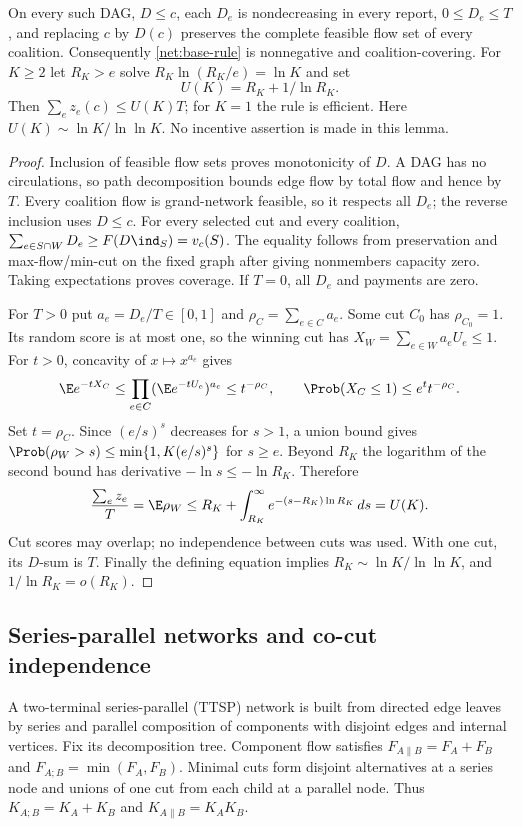 \begin{lemma}
\label{net:preservation}
On every such DAG, $D\le c$, each $D_e$ is nondecreasing in every report,
$0\le D_e\le T$, and replacing $c$ by $D(c)$ preserves the complete feasible
flow set of every coalition.  Consequently \eqref{net:base-rule} is
nonnegative and coalition-covering.  For $K\ge2$ let $R_K>e$ solve
$R_K\ln(R_K/e)=\ln K$ and set
\[
 U(K)=R_K+1/\ln R_K.
\]
Then $\sum_ez_e(c)\le U(K)T$; for $K=1$ the rule is efficient.
Here $U(K)\sim\ln K/\ln\ln K$.  No incentive assertion is made in this lemma.
\end{lemma}
\begin{proof}
Inclusion of feasible flow sets proves monotonicity of $D$.  A DAG has no
circulations, so path decomposition bounds edge flow by total flow and hence
by $T$.  Every coalition flow is grand-network feasible, so it respects all
$D_e$; the reverse inclusion uses $D\le c$.
For every selected cut and every coalition,
$\sum_{e\in S\cap W}D_e\ge F(D\ind_S)=v_c(S)$.
The equality follows from preservation and max-flow/min-cut on the fixed
graph after giving nonmembers capacity zero.  Taking expectations proves
coverage.  If $T=0$, all $D_e$ and payments are zero.

For $T>0$ put $a_e=D_e/T\in[0,1]$ and $\rho_C=\sum_{e\in C}a_e$.
Some cut $C_0$ has $\rho_{C_0}=1$.  Its random score is at most one, so the
winning cut has $X_W=\sum_{e\in W}a_eU_e\le1$.
For $t>0$, concavity of $x\mapsto x^{a_e}$ gives
\[
 \E e^{-tX_C}\le\prod_{e\in C}(\E e^{-tU_e})^{a_e}
 \le t^{-\rho_C},\qquad
 \Prob(X_C\le1)\le e^t t^{-\rho_C}.
\]
Set $t=\rho_C$.  Since $(e/s)^s$ decreases for $s>1$, a union bound gives
$\Prob(\rho_W>s)\le\min\{1,K(e/s)^s\}$ for $s\ge e$.
Beyond $R_K$ the logarithm of the second bound has derivative
$-\ln s\le-\ln R_K$.  Therefore
\[
 \frac{\sum_ez_e}{T}=\E\rho_W
 \le R_K+\int_{R_K}^\infty e^{-(s-R_K)\ln R_K}\,ds=U(K).
\]
Cut scores may overlap; no independence between cuts was used.
With one cut, its $D$-sum is $T$.  Finally the defining equation implies
$R_K\sim\ln K/\ln\ln K$, and $1/\ln R_K=o(R_K)$.
\end{proof}

\subsection{Series-parallel networks and co-cut independence}
A two-terminal series-parallel (TTSP) network is built from directed edge
leaves by series and parallel composition of components with disjoint edges
and internal vertices.  Fix its decomposition tree.  Component flow satisfies
$F_{A\parallel B}=F_A+F_B$ and $F_{A;B}=\min(F_A,F_B)$.
Minimal cuts form disjoint alternatives at a series node and unions of one
cut from each child at a parallel node.  Thus
$K_{A;B}=K_A+K_B$ and $K_{A\parallel B}=K_AK_B$.

